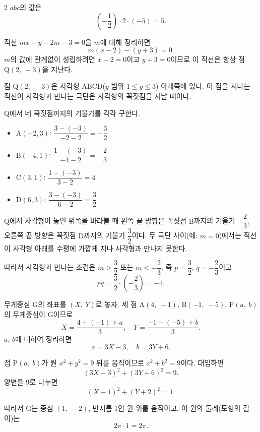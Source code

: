 \documentclass[10pt,fleqn]{article}
\begin{document}
\begin{multicols}{2}
$abc$의 값은
\[ \left(-\dfrac{1}{2}\right) \cdot 2 \cdot (-5) = 5. \]


직선 $mx - y - 2m - 3 = 0$을 $m$에 대해 정리하면
\[ m(x - 2) - (y + 3) = 0. \]
$m$의 값에 관계없이 성립하려면 $x - 2 = 0$이고 $y + 3 = 0$이므로 이 직선은 항상 점 $\mathrm{Q}(2,\ -3)$을 지난다.

점 $\mathrm{Q}(2,\ -3)$은 사각형 $\mathrm{ABCD}$($y$ 범위 $1 \le y \le 3$) 아래쪽에 있다. 이 점을 지나는 직선이 사각형과 만나는 극단은 사각형의 꼭짓점을 지날 때이다.

$\mathrm{Q}$에서 네 꼭짓점까지의 기울기를 각각 구한다.
\begin{itemize}[leftmargin=1.2em, itemsep=1pt]
\item $\mathrm{A}(-2, 3)$: $\dfrac{3-(-3)}{-2-2} = -\dfrac{3}{2}$
\item $\mathrm{B}(-4, 1)$: $\dfrac{1-(-3)}{-4-2} = -\dfrac{2}{3}$
\item $\mathrm{C}(3, 1)$: $\dfrac{1-(-3)}{3-2} = 4$
\item $\mathrm{D}(6, 3)$: $\dfrac{3-(-3)}{6-2} = \dfrac{3}{2}$
\end{itemize}

$\mathrm{Q}$에서 사각형이 놓인 위쪽을 바라볼 때 왼쪽 끝 방향은 꼭짓점 $\mathrm{B}$까지의 기울기 $-\dfrac{2}{3}$, 오른쪽 끝 방향은 꼭짓점 $\mathrm{D}$까지의 기울기 $\dfrac{3}{2}$이다. 두 극단 사이(예: $m = 0$)에서는 직선이 사각형 아래를 수평에 가깝게 지나 사각형과 만나지 못한다.

따라서 사각형과 만나는 조건은 $m \ge \dfrac{3}{2}$ 또는 $m \le -\dfrac{2}{3}$. 즉 $p = \dfrac{3}{2}$, $q = -\dfrac{2}{3}$이고
\[ pq = \dfrac{3}{2} \cdot \left(-\dfrac{2}{3}\right) = -1. \]


무게중심 $\mathrm{G}$의 좌표를 $(X,\ Y)$로 놓자. 세 점 $\mathrm{A}(4,\ -1)$, $\mathrm{B}(-1,\ -5)$, $\mathrm{P}(a,\ b)$의 무게중심이 $\mathrm{G}$이므로
\[ X = \dfrac{4 + (-1) + a}{3},\quad Y = \dfrac{-1 + (-5) + b}{3}. \]
$a$, $b$에 대하여 정리하면
\[ a = 3X - 3,\quad b = 3Y + 6. \]

점 $\mathrm{P}(a,\ b)$가 원 $x^{2} + y^{2} = 9$ 위를 움직이므로 $a^{2} + b^{2} = 9$이다. 대입하면
\[ (3X - 3)^{2} + (3Y + 6)^{2} = 9. \]
양변을 $9$로 나누면
\[ (X - 1)^{2} + (Y + 2)^{2} = 1. \]

따라서 $\mathrm{G}$는 중심 $(1,\ -2)$, 반지름 $1$인 원 위를 움직이고, 이 원의 둘레(도형의 길이)는
\[ 2\pi \cdot 1 = 2\pi. \]


\end{multicols}
\end{document}

